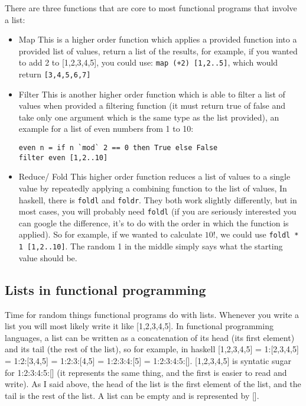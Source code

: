   There are three functions that are core to most functional programs that involve a list:
  \begin{itemize}
  	\item Map
	  	\subitem This is a higher order function which applies a provided function into a provided list of values, return a list of the results, for example, if you wanted to add 2 to [1,2,3,4,5], you could use: \verb|map (+2) [1,2..5]|, which would return \verb|[3,4,5,6,7]|
  	\item Filter
	  	\subitem This is another higher order function which is able to filter a list of values when provided a filtering function (it must return true of false and take only one argument which is the same type as the list provided), an example for a list of even numbers from 1 to 10:
  	\begin{verbatim}
even n = if n `mod` 2 == 0 then True else False
filter even [1,2..10]\end{verbatim}
  	\item Reduce/ Fold
	  	\subitem This higher order function reduces a list of values to a single value by repeatedly applying a combining function to the list of values, In haskell, there is \verb|foldl| and \verb|foldr|. They both work slightly differently, but in most cases, you will probably need \verb|foldl| (if you are seriously interested you can google the difference, it's to do with the order in which the function is applied). So for example, if we wanted to calculate $10!$, we could use \verb|foldl * 1 [1,2..10]|. The random 1 in the middle simply says what the starting value should be.
  \end{itemize}

\subsection{Lists in functional programming}

  \noindent
  Time for random things functional programs do with lists. Whenever you write a list you will most likely write it like [1,2,3,4,5]. In functional programming languages, a list can be written as a concatenation of its head (its first element) and its tail (the rest of the list), so for example, in haskell [1,2,3,4,5] = 1:[2,3,4,5] = 1:2:[3,4,5] = 1:2:3:[4,5] = 1:2:3:4:[5] = 1:2:3:4:5:[]. [1,2,3,4,5] is syntatic sugar for 1:2:3:4:5:[] (it represents the same thing, and the first is easier to read and write). As I said above, the head of the list is the first element of the list, and the tail is the rest of the list. A list can be empty and is represented by [].
  
